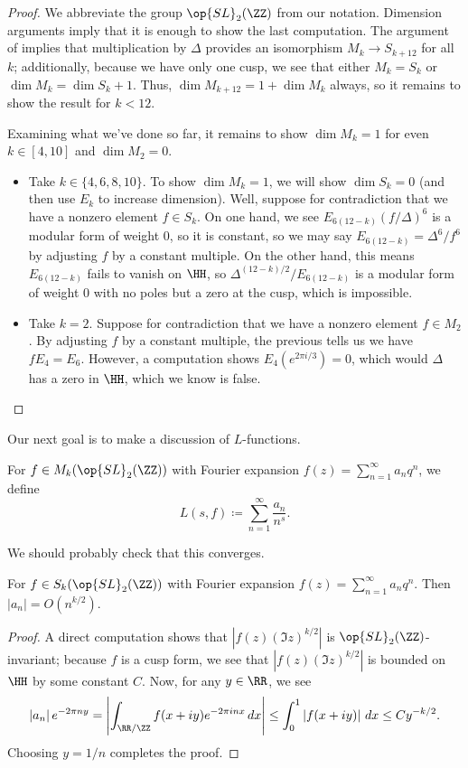 \documentclass{article}
\begin{document}
\begin{proof}
	We abbreviate the group $\op{SL}_2(\ZZ)$ from our notation. Dimension arguments imply that it is enough to show the last computation. The argument of  implies that multiplication by $\Delta$ provides an isomorphism $M_{k}\to S_{k+12}$ for all $k$; additionally, because we have only one cusp, we see that either $M_k=S_k$ or $\dim M_k=\dim S_k+1$. Thus, $\dim M_{k+12}=1+\dim M_k$ always, so it remains to show the result for $k<12$.

	Examining what we've done so far, it remains to show $\dim M_k=1$ for even $k\in[4,10]$ and $\dim M_2=0$.
	\begin{itemize}
		\item Take $k\in\{4,6,8,10\}$. To show $\dim M_k=1$, we will show $\dim S_k=0$ (and then use $E_k$ to increase dimension). Well, suppose for contradiction that we have a nonzero element $f\in S_k$. On one hand, we see $E_{6(12-k)}(f/\Delta)^6$ is a modular form of weight $0$, so it is constant, so we may say $E_{6(12-k)}=\Delta^6/f^6$ by adjusting $f$ by a constant multiple. On the other hand, this means $E_{6(12-k)}$ fails to vanish on $\HH$, so $\Delta^{(12-k)/2}/E_{6(12-k)}$ is a modular form of weight $0$ with no poles but a zero at the cusp, which is impossible.
		\item Take $k=2$. Suppose for contradiction that we have a nonzero element $f\in M_2$. By adjusting $f$ by a constant multiple, the previous tells us we have $fE_4=E_6$. However, a computation shows $E_4\left(e^{2\pi i/3}\right)=0$, which would $\Delta$ has a zero in $\HH$, which we know is false.
		\qedhere
	\end{itemize}
\end{proof}
Our next goal is to make a discussion of $L$-functions.
\begin{definition}[$L$-function]
	For $f\in M_k(\op{SL}_2(\ZZ))$ with Fourier expansion $f(z)=\sum_{n=1}^\infty a_nq^n$, we define
	\[L(s,f)\coloneqq\sum_{n=1}^\infty\frac{a_n}{n^s}.\]
\end{definition}
We should probably check that this converges.
\begin{proposition}
	For $f\in S_k(\op{SL}_2(\ZZ))$ with Fourier expansion $f(z)=\sum_{n=1}^\infty a_nq^n$. Then $\left|a_n\right|=O\left(n^{k/2}\right)$.
\end{proposition}
\begin{proof}
	A direct computation shows that $\left|f(z)(\Im z)^{k/2}\right|$ is $\op{SL}_2(\ZZ)$-invariant; because $f$ is a cusp form, we see that $\left|f(z)(\Im z)^{k/2}\right|$ is bounded on $\HH$ by some constant $C$. Now, for any $y\in\RR$, we see
	\[\left|a_n\right|e^{-2\pi ny}=\left|\int_{\RR/\ZZ}f(x+iy)e^{-2\pi inx}\,dx\right|\le\int_0^1\left|f(x+iy)\right|\,dx\le Cy^{-k/2}.\]
	Choosing $y=1/n$ completes the proof.
\end{proof}
\end{document}
